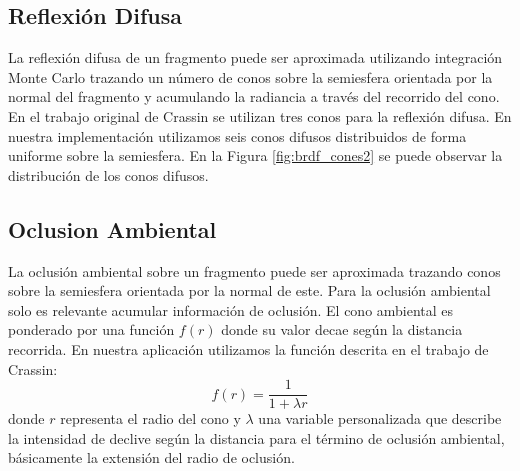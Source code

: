 \subsection{Reflexión Difusa}
La reflexión difusa de un fragmento puede ser aproximada utilizando integración Monte Carlo trazando un número de conos sobre la semiesfera orientada por la normal del fragmento y acumulando la radiancia a través del recorrido del cono. En el trabajo original de Crassin se utilizan tres conos para la reflexión difusa. En nuestra implementación utilizamos seis conos difusos distribuidos de forma uniforme sobre la semiesfera. En la Figura \ref{fig:brdf_cones2} se puede observar la distribución de los conos difusos.
\subsection{Oclusion Ambiental}
\label{sub:occl_ambt_prop}
La oclusión ambiental sobre un fragmento puede ser aproximada trazando conos sobre la semiesfera orientada por la normal de este. Para la oclusión ambiental solo es relevante acumular información de oclusión. El cono ambiental es ponderado por una función $f(r)$ donde su valor decae según la distancia recorrida. En nuestra aplicación utilizamos la función descrita en el trabajo de Crassin:
\begin{equation}
	f(r) = \frac{1}{1+\lambda r}
\end{equation} donde $r$ representa el radio del cono y $\lambda$ una variable personalizada que describe la intensidad de declive según la distancia para el término de oclusión ambiental, básicamente la extensión del radio de oclusión.
